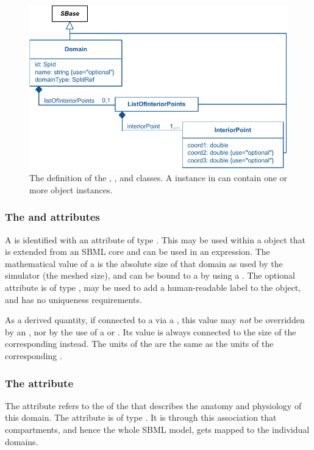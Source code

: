 \begin{figure}[ht]
  \includegraphics{figs/Domain-uml}
  \caption{The definition of the \Domain, \ListOfInteriorPoints, and \InteriorPoint classes.  A \ListOfDomains instance in \Geometry can contain one or more \Domain object instances.}
  \label{Domain-uml}
  \label{InteriorPoint-uml}
  \label{ListOfInteriorPoints-uml}
\end{figure}

\subsubsection{The \fixttspace{} and \fixttspace{} attributes}
A \Domain is identified with an  attribute of type .  This  may be used within a \SpatialSymbolReference object that is extended from an SBML core \Parameter and can be used in an expression.  The mathematical value of a \Domain is the absolute size of that domain as used by the simulator (the meshed size), and can be bound to a \Parameter by using a \SpatialSymbolReference.  The optional  attribute is of type , may be used to add a human-readable label to the object, and has no uniqueness requirements.

As a derived quantity, if connected to a \Parameter via a \SpatialSymbolReference, this value may \emph{not} be overridden by an \InitialAssignment, nor by the use of a \Rule or \Event.  Its value is always connected to the size of the corresponding \Geometry instead.  The units of the \Domain are the same as the units of the corresponding \DomainType.

\subsubsection{The \fixttspace{} attribute}
The  attribute refers to the  of the \DomainType that describes the anatomy and physiology of this domain. The attribute is of type . It is through this association that compartments, and hence the whole SBML model, gets mapped to the individual domains. 



